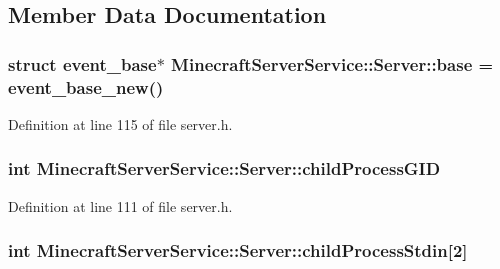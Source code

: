 \subsection{Member Data Documentation}
\subsubsection[{\texorpdfstring{base}{base}}]{\setlength{\rightskip}{0pt plus 5cm}struct event\+\_\+base$\ast$ Minecraft\+Server\+Service\+::\+Server\+::base = event\+\_\+base\+\_\+new()\hspace{0.3cm}{\ttfamily [protected]}}\hypertarget{class_minecraft_server_service_1_1_server_a12dbc6c931c04754ef5600e8ad03cc4c}{}\label{class_minecraft_server_service_1_1_server_a12dbc6c931c04754ef5600e8ad03cc4c}


Definition at line 115 of file server.\+h.

\subsubsection[{\texorpdfstring{child\+Process\+G\+ID}{childProcessGID}}]{\setlength{\rightskip}{0pt plus 5cm}int Minecraft\+Server\+Service\+::\+Server\+::child\+Process\+G\+ID\hspace{0.3cm}{\ttfamily [protected]}}\hypertarget{class_minecraft_server_service_1_1_server_a116eb894b58076ec10c694d4acb11d48}{}\label{class_minecraft_server_service_1_1_server_a116eb894b58076ec10c694d4acb11d48}


Definition at line 111 of file server.\+h.

\subsubsection[{\texorpdfstring{child\+Process\+Stdin}{childProcessStdin}}]{\setlength{\rightskip}{0pt plus 5cm}int Minecraft\+Server\+Service\+::\+Server\+::child\+Process\+Stdin\mbox{[}2\mbox{]}\hspace{0.3cm}{\ttfamily [protected]}}\hypertarget{class_minecraft_server_service_1_1_server_a6fa4025b32b4ff9aa2cce5c33c6a5eff}{}\label{class_minecraft_server_service_1_1_server_a6fa4025b32b4ff9aa2cce5c33c6a5eff}


